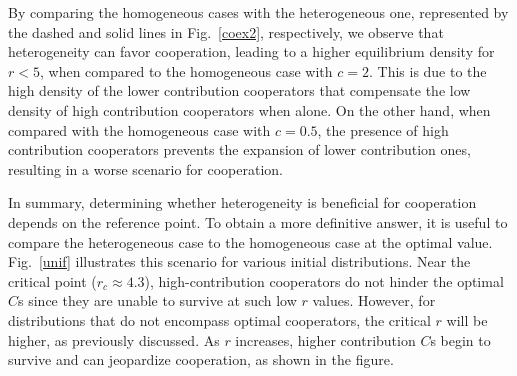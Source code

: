 \documentclass[twocolumn,aps,amsmath,pre,floatfix,superscriptaddress]{revtex4-2}
\begin{document}
By comparing the homogeneous cases with the heterogeneous one, represented by the dashed and solid lines in Fig.~\ref{coex2}, respectively, we observe that heterogeneity can favor cooperation, leading to a higher equilibrium density for $r<5$, when compared to the homogeneous case with $c=2$. 
%
This is due to the high density of the lower contribution cooperators that compensate the low density of high contribution cooperators when alone. On the other hand, when compared with the homogeneous case with $c=0.5$, the presence of high contribution cooperators prevents the expansion of lower contribution ones, resulting in a worse scenario for cooperation.

%
In summary, determining whether heterogeneity is beneficial for cooperation depends on the reference point. To obtain a more definitive answer, it is useful to compare the heterogeneous case to the homogeneous case at the optimal value. Fig.~\ref{unif} illustrates this scenario for various initial distributions. 
%
Near the critical point ($r_{c}\approx 4.3$), high-contribution cooperators do not hinder the optimal $C$s  since they are unable to survive at such low $r$ values. However, for distributions that do not encompass optimal cooperators, the critical $r$ will be higher, as previously discussed. 
%
As $r$ increases, higher contribution $C$s begin to survive and can jeopardize cooperation, as shown in the figure. 
\end{document}
